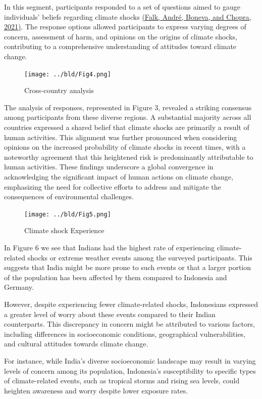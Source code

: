 \documentclass[11pt, a4paper, leqno]{article}
\begin{document}
In this segment, participants responded to a set of questions aimed to gauge individuals' beliefs regarding climate shocks \href{https://www.econtribute.de/RePEc/ajk/ajkdps/ECONtribute_101_2021.pdf}{(Falk, André, Boneva, and Chopra, 2021)}. The response options allowed participants to express varying degrees of concern, assessment of harm, and opinions on the origins of climate shocks, contributing to a comprehensive understanding of attitudes toward climate change.


\begin{figure} [h]
  \centering
  \texttt{[image: ../bld/Fig4.png]} 
  \caption{Cross-country analysis}
\end{figure}

\noindent The analysis of responses, represented in Figure 3, revealed a striking consensus among participants from these diverse regions. A substantial majority across all countries expressed a shared belief that climate shocks are primarily a result of human activities. This alignment was further pronounced when considering opinions on the increased probability of climate shocks in recent times, with a noteworthy agreement that this heightened risk is predominantly attributable to human activities. These findings underscore a global convergence in acknowledging the significant impact of human actions on climate change, emphasizing the need for collective efforts to address and mitigate the consequences of environmental challenges.

\begin{figure} [h]
  \centering
  \texttt{[image: ../bld/Fig5.png]} 
  \caption{Climate shock Experience}
\end{figure}

\noindent In Figure 6 we see that Indians had the highest rate of experiencing climate-related shocks or extreme weather events among the surveyed participants. This suggests that India might be more prone to such events or that a larger portion of the population has been affected by them compared to Indonesia and Germany.

\noindent However, despite experiencing fewer climate-related shocks, Indonesians expressed a greater level of worry about these events compared to their Indian counterparts. This discrepancy in concern might be attributed to various factors, including differences in socioeconomic conditions, geographical vulnerabilities, and cultural attitudes towards climate change.

\noindent For instance, while India's diverse socioeconomic landscape may result in varying levels of concern among its population, Indonesia's susceptibility to specific types of climate-related events, such as tropical storms and rising sea levels, could heighten awareness and worry despite lower exposure rates.
\end{document}
